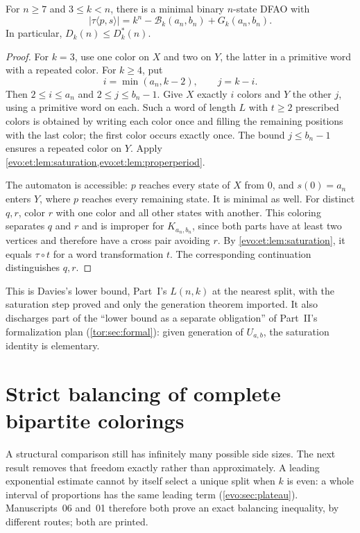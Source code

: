 \documentclass[11pt,a4paper]{article}
\numberwithin{equation}{section}
\theoremstyle{definition}
\theoremstyle{remark}
\newcommand{\Bip}{\mathcal B}
\begin{document}
\begin{proposition}\label{evo:et:prop:witness}
For $n\ge7$ and $3\le k<n$, there is a minimal binary $n$-state DFAO with
\[
 |\tau\langle p,s\rangle|=k^n-\Bip_k(a_n,b_n)+G_k(a_n,b_n).
\]
In particular, $D_k(n)\le D^*_k(n)$.
\end{proposition}
\begin{proof}
For $k=3$, use one color on $X$ and two on $Y$, the latter in a primitive word
with a repeated color. For $k\ge4$, put
\[
 i=\min(a_n,k-2),\qquad j=k-i.
\]
Then $2\le i\le a_n$ and $2\le j\le b_n-1$. Give $X$ exactly $i$ colors and
$Y$ the other $j$, using a primitive word on each. Such a word of length $L$
with $t\ge2$ prescribed colors is obtained by writing each color once and
filling the remaining positions with the last color; the first color occurs
exactly once. The bound $j\le b_n-1$ ensures a repeated color on $Y$. Apply
\cref{evo:et:lem:saturation,evo:et:lem:properperiod}.

The automaton is accessible: $p$ reaches every state of $X$ from $0$, and
$s(0)=a_n$ enters $Y$, where $p$ reaches every remaining state. It is minimal
as well. For distinct $q,r$, color $r$ with one color and all other states
with another. This coloring separates $q$ and $r$ and is improper for
$K_{a_n,b_n}$, since both parts have at least two vertices and therefore have
a cross pair avoiding $r$. By \cref{evo:et:lem:saturation}, it equals
$\tau\circ t$ for a word transformation $t$. The corresponding continuation
distinguishes $q,r$.
\end{proof}

This is Davies's lower bound, Part~I's $L(n,k)$ at the nearest split, with
the saturation step proved and only the generation theorem imported. It also
discharges part of the ``lower bound as a separate obligation'' of Part~II's
formalization plan (\cref{tor:sec:formal}): given generation of $U_{a,b}$, the
saturation identity is elementary.

\section{Strict balancing of complete bipartite colorings}\label{evo:sec:balance}

A structural comparison still has infinitely many possible side sizes. The
next result removes that freedom exactly rather than approximately. A leading
exponential estimate cannot by itself select a unique split when $k$ is even:
a whole interval of proportions has the same leading term
(\cref{evo:sec:plateau}). Manuscripts~06 and~01 therefore both prove an exact
balancing inequality, by different routes; both are printed.
\end{document}

